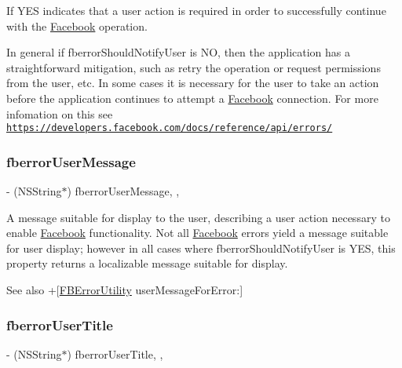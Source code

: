 If Y\+ES indicates that a user action is required in order to successfully continue with the \hyperlink{interfaceFacebook}{Facebook} operation.

In general if fberror\+Should\+Notify\+User is NO, then the application has a straightforward mitigation, such as retry the operation or request permissions from the user, etc. In some cases it is necessary for the user to take an action before the application continues to attempt a \hyperlink{interfaceFacebook}{Facebook} connection. For more infomation on this see \href{https://developers.facebook.com/docs/reference/api/errors/}{\tt https\+://developers.\+facebook.\+com/docs/reference/api/errors/} \mbox{\label{categoryNSError_07FBError_08_a96ac758ea6dba64313a38fe957730a83}} 
\subsubsection{\texorpdfstring{fberror\+User\+Message}{fberrorUserMessage}}
{\footnotesize\ttfamily -\/ (N\+S\+String$\ast$) fberror\+User\+Message\hspace{0.3cm}{\ttfamily [read]}, {\ttfamily [atomic]}, {\ttfamily [copy]}}

A message suitable for display to the user, describing a user action necessary to enable \hyperlink{interfaceFacebook}{Facebook} functionality. Not all \hyperlink{interfaceFacebook}{Facebook} errors yield a message suitable for user display; however in all cases where fberror\+Should\+Notify\+User is Y\+ES, this property returns a localizable message suitable for display.

\begin{DoxySeeAlso}{See also}
+\mbox{[}\hyperlink{interfaceFBErrorUtility}{F\+B\+Error\+Utility} user\+Message\+For\+Error\+:\mbox{]} 
\end{DoxySeeAlso}
\mbox{\label{categoryNSError_07FBError_08_a4e7460632037ca8b5750ff586085ae30}} 
\subsubsection{\texorpdfstring{fberror\+User\+Title}{fberrorUserTitle}}
{\footnotesize\ttfamily -\/ (N\+S\+String$\ast$) fberror\+User\+Title\hspace{0.3cm}{\ttfamily [read]}, {\ttfamily [atomic]}, {\ttfamily [copy]}}

